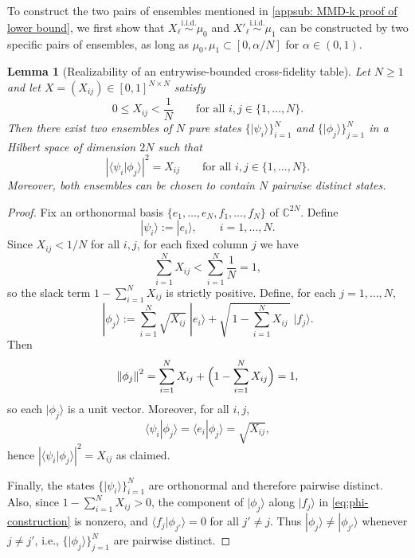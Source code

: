 \documentclass[aps,prx,reprint,superscriptaddress,amsmath,amssymb,longbibliography,floatfix]{revtex4-2}
\newcommand{\norm}[1]{\left \lVert #1 \right \rVert}
\newcommand{\Abs}[1]{\left\lvert #1\right\rvert}
\providecommand{\ket}[1]{|#1 \rangle}
\providecommand{\braket}[2]{\langle #1|#2 \rangle}
\theoremstyle{plain}
\newtheorem{lemma}[theorem]{Lemma}
\theoremstyle{definition}
\theoremstyle{remark}
\begin{document}
To construct the two pairs of ensembles mentioned in \ref{appsub: MMD-k proof of lower bound}, we first show that $X_\ell\overset{\text{i.i.d.}}{\sim}\mu_0$ and $X'_\ell\overset{\text{i.i.d.}}{\sim}\mu_1$ can be constructed by two specific pairs of ensembles, as long as $\mu_0,\mu_1 \subset [0,\alpha/N]$ for $\alpha\in(0,1)$.
\begin{lemma}[Realizability of an entrywise-bounded cross-\allowbreak fidelity table]
\label{lem:realize-bounded-fidelity-table}
Let $N\ge 1$ and let $X=(X_{ij})\in[0,1]^{N\times N}$ satisfy
\begin{equation}
    0\le X_{ij} < \frac{1}{N}\qquad \text{for all } i,j\in\{1,\dots,N\}.
\end{equation}
Then there exist two ensembles of $N$ pure states $\{\ket{\psi_i}\}_{i=1}^N$ and $\{\ket{\phi_j}\}_{j=1}^N$
in a Hilbert space of dimension $2N$ such that
\begin{equation}
    \Abs{\braket{\psi_i}{\phi_j}}^2 = X_{ij}\qquad \text{for all } i,j\in\{1,\dots,N\}.
\label{eq:app-cross-fidelity-realization}
\end{equation}
Moreover, both ensembles can be chosen to contain $N$ pairwise distinct states.
\end{lemma}

\begin{proof}
Fix an orthonormal basis $\{e_1,\dots,e_N,f_1,\dots,f_N\}$ of $\mathbb{C}^{2N}$.
Define
\begin{equation*}
    \ket{\psi_i} := \ket{e_i},\qquad i=1,\dots,N.
\end{equation*}
Since $X_{ij}<1/N$ for all $i,j$, for each fixed column $j$ we have
\begin{equation*}
    \sum_{i=1}^N X_{ij} < \sum_{i=1}^N \frac{1}{N} = 1,
\end{equation*}
so the slack term $1-\sum_{i=1}^N X_{ij}$ is strictly positive. Define, for each $j=1,\dots,N$,
\begin{equation}
\label{eq:phi-construction}
    \ket{\phi_j}
    := \sum_{i=1}^N \sqrt{X_{ij}}\;\ket{e_i}
    + \sqrt{\,1-\sum_{i=1}^N X_{ij}\,}\;\ket{f_j}.
\end{equation}
Then
\begin{equation*}
    \norm{\phi_j}^2
    = \sum_{i=1}^N X_{ij} + \Bigl(1-\sum_{i=1}^N X_{ij}\Bigr)
    = 1,
\end{equation*}
so each $\ket{\phi_j}$ is a unit vector. Moreover, for all $i,j$,
\begin{equation*}
    \braket{\psi_i}{\phi_j} = \braket{e_i}{\phi_j} = \sqrt{X_{ij}},
\end{equation*}
hence $\Abs{\braket{\psi_i}{\phi_j}}^2=X_{ij}$ as claimed.

Finally, the states $\{\ket{\psi_i}\}_{i=1}^N$ are orthonormal and therefore pairwise distinct.
Also, since $1-\sum_{i=1}^N X_{ij}>0$, the component of $\ket{\phi_j}$ along $\ket{f_j}$ in
\eqref{eq:phi-construction} is nonzero, and $\braket{f_j}{\phi_{j'}}=0$ for all $j'\neq j$.
Thus $\ket{\phi_j}\neq \ket{\phi_{j'}}$ whenever $j\neq j'$, i.e., $\{\ket{\phi_j}\}_{j=1}^N$ are pairwise distinct.
\end{proof}
\end{document}
